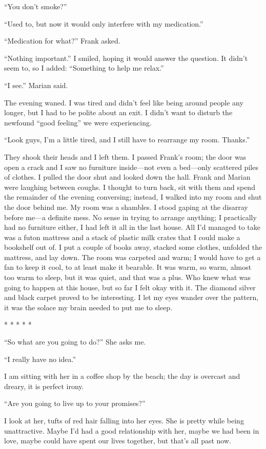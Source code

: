 ``You don't smoke?''

``Used to, but now it would only interfere with my medication.''

``Medication for what?'' Frank asked.

``Nothing important.'' I smiled, hoping it would answer the question. It
didn't seem to, so I added: ``Something to help me relax.''

``I see.'' Marian said.

The evening waned. I was tired and didn't feel like being around people
any longer, but I had to be polite about an exit. I didn't want to
disturb the newfound ``good feeling'' we were experiencing.

``Look guys, I'm a little tired, and I still have to rearrange my room.
Thanks.''

They shook their heads and I left them. I passed Frank's room; the door
was open a crack and I saw no furniture inside---not even a bed---only
scattered piles of clothes. I pulled the door shut and looked down the
hall. Frank and Marian were laughing between coughs. I thought to turn
back, sit with them and spend the remainder of the evening conversing;
instead, I walked into my room and shut the door behind me. My room was
a shambles. I stood gaping at the disarray before me---a definite mess.
No sense in trying to arrange anything; I practically had no furniture
either, I had left it all in the last house. All I'd managed to take was
a futon mattress and a stack of plastic milk crates that I could make a
bookshelf out of. I put a couple of books away, stacked some clothes,
unfolded the mattress, and lay down. The room was carpeted and warm; I
would have to get a fan to keep it cool, to at least make it bearable.
It was warm, so warm, almost too warm to sleep, but it was quiet, and
that was a plus. Who knew what was going to happen at this house, but so
far I felt okay with it. The diamond silver and black carpet proved to
be interesting. I let my eyes wander over the pattern, it was the solace
my brain needed to put me to sleep.

* * * * *

``So what are you going to do?'' She asks me.

``I really have no idea.''

I am sitting with her in a coffee shop by the beach; the day is overcast
and dreary, it is perfect irony.

``Are you going to live up to your promises?''

I look at her, tufts of red hair falling into her eyes. She is pretty
while being unattractive. Maybe I'd had a good relationship with her,
maybe we had been in love, maybe could have spent our lives together,
but that's all past now.


